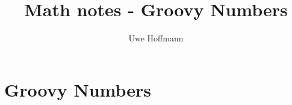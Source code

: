 

\title{Math notes - Groovy Numbers}
\author{Uwe Hoffmann}



\setcounter{chapter}{0}
\chapter{Groovy Numbers}
